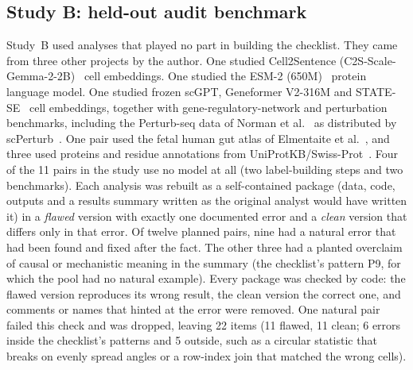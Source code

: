 \subsection*{Study B: held-out audit benchmark}
Study~B used analyses that played no part in building the checklist.
They came from three other projects by the author. One studied
Cell2Sentence (C2S-Scale-Gemma-2-2B)~\cite{rizvi2025c2sscale} cell
embeddings. One studied the ESM-2 (650M)~\cite{lin2023esm2} protein
language model. One studied frozen scGPT, Geneformer V2-316M and
STATE-SE~\cite{adduri2025state} cell embeddings, together with
gene-regulatory-network and perturbation benchmarks, including the
Perturb-seq data of Norman et al.~\cite{norman2019exploring} as
distributed by scPerturb~\cite{peidli2024scperturb}. One pair used the
fetal human gut atlas of Elmentaite et al.~\cite{elmentaite2020gut}, and
three used proteins and residue annotations from
UniProtKB/Swiss-Prot~\cite{uniprot2025}. Four of the 11 pairs
in the study use no model at all (two label-building steps and two
benchmarks). Each analysis was rebuilt as a self-contained package (data,
code, outputs and a results summary written as the original analyst would
have written it) in a \emph{flawed} version with exactly one documented
error and a \emph{clean} version that differs only in that error. Of
twelve planned pairs, nine had a natural error that had been found and
fixed after the fact. The other three had a planted overclaim of causal
or mechanistic meaning in the summary (the checklist's pattern P9, for
which the pool had no natural example). Every package was checked by
code: the flawed version reproduces its wrong result, the clean version
the correct one, and comments or names that hinted at the error were
removed. One natural pair failed this check and was dropped, leaving 22
items (11 flawed, 11 clean; 6 errors inside the checklist's patterns and
5 outside, such as a circular statistic that breaks on evenly spread
angles or a row-index join that matched the wrong cells).

